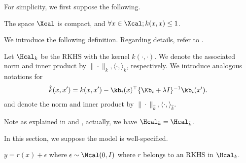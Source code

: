 For simplicity, we first suppose the following. 
\begin{assum}
   The space $\Xcal$ is compact, and $\forall x \in \Xcal; k(x,x)\leq 1$. 
\end{assum}

We introduce the following definition. Regarding details, refer to \citet[Chapter 12]{wainwright2019high}. 
\begin{definition}
   Let $\Hcal_k$ be the RKHS with the kernel $k(\cdot,\cdot)$. We denote the associated norm and inner product by $\|\cdot\|_k,\langle \cdot,\rangle_k$, respectively. We introduce analogous notations for 
   \begin{align*}
        \hat k(x,x')= k(x,x')-\kb_i(x)^{\top}\{ \Kb_i+\lambda I \}^{-1}  \kb_i(x'). 
   \end{align*}
   and denote the norm and inner product by $\|\cdot\|_{\hat k},\langle \cdot,\rangle_{\hat k}$. 
\end{definition}
Note as explained in  \citet[Appendix B]{srinivas2009gaussian} and \citet[Chapter C.3]{chang2021mitigating}, actually, we have $\Hcal_k =\Hcal_{\hat k}$.  

In this section, we suppose the model is well-specified. 
\begin{assum}
   $ y = r(x) + \epsilon$ where $\epsilon\sim \Ncal(0,I)$ where $r$ belongs to an RKHS in $\Hcal_k$.  
\end{assum}

